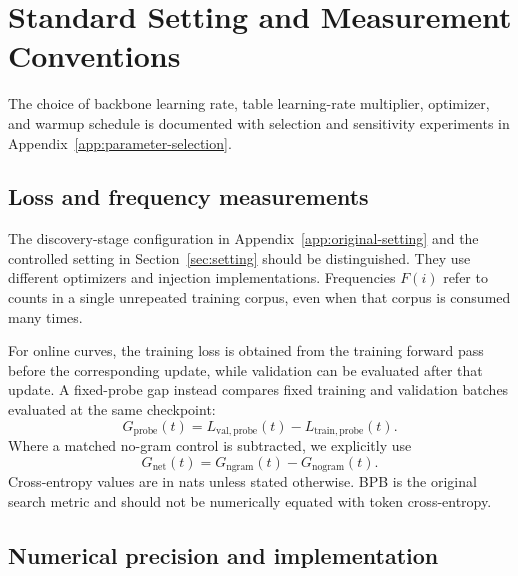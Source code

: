 \section{Standard Setting and Measurement Conventions}
\label{app:setting}

The choice of backbone learning rate, table learning-rate multiplier, optimizer, and warmup schedule is documented with selection and sensitivity experiments in Appendix~\ref{app:parameter-selection}.

\subsection{Loss and frequency measurements}

The discovery-stage configuration in Appendix~\ref{app:original-setting} and the controlled setting in Section~\ref{sec:setting} should be distinguished. They use different optimizers and injection implementations. Frequencies $F(i)$ refer to counts in a single unrepeated training corpus, even when that corpus is consumed many times.

For online curves, the training loss is obtained from the training forward pass before the corresponding update, while validation can be evaluated after that update. A fixed-probe gap instead compares fixed training and validation batches evaluated at the same checkpoint:
\begin{equation}
 G_{\mathrm{probe}}(t)
 =L_{\mathrm{val,probe}}(t)-L_{\mathrm{train,probe}}(t).
\end{equation}
Where a matched no-gram control is subtracted, we explicitly use
\begin{equation}
 G_{\mathrm{net}}(t)
 =G_{\mathrm{ngram}}(t)-G_{\mathrm{nogram}}(t).
\end{equation}
Cross-entropy values are in nats unless stated otherwise. BPB is the original search metric and should not be numerically equated with token cross-entropy.


\subsection{Numerical precision and implementation}

